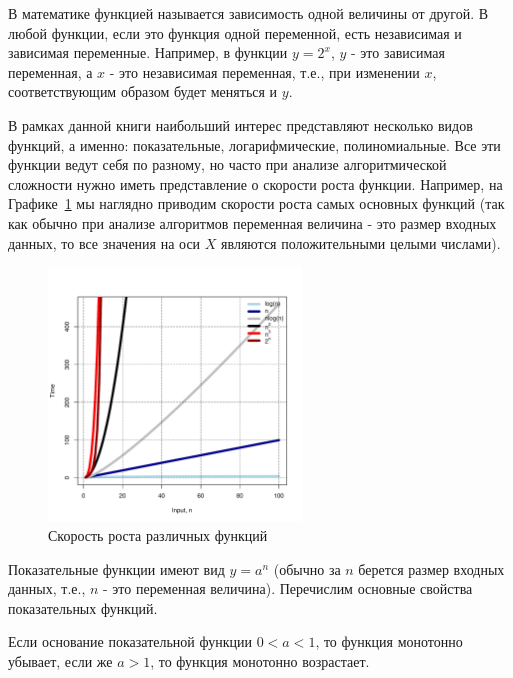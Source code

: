 В математике функцией называется зависимость одной величины от другой. В любой функции,
если это функция одной переменной, есть независимая и зависимая переменные. Например, в функции
$y=2^x$, $y$ - это зависимая переменная, а $x$ - это независимая переменная, т.е., при изменении
$x$, соответствующим образом будет меняться и $y$. 

В рамках данной книги наибольший интерес представляют несколько видов функций, а именно: 
показательные, логарифмические, полиномиальные. Все эти функции ведут себя по разному, но
часто при анализе алгоритмической сложности нужно иметь представление о скорости роста функции.
Например, на Графике~\ref{fig:functions} мы наглядно приводим скорости роста самых основных 
функций (так как обычно при анализе алгоритмов переменная величина - это размер входных данных, 
то все значения на оси $X$ являются положительными целыми числами).

\begin{figure}[h!]
\centering
\includegraphics[width=0.6\textwidth]{graphics/functions.pdf}
\caption{Скорость роста различных функций}
\label{fig:functions}
\end{figure}

Показательные функции имеют вид $y=a^n$ (обычно за $n$ берется размер входных данных, т.е., 
$n$ - это переменная величина). Перечислим основные свойства показательных функций. 

\begin{definition}
Если основание показательной функции $0<a<1$, то функция монотонно убывает, если же $a>1$,
то функция монотонно возрастает.
\end{definition}

